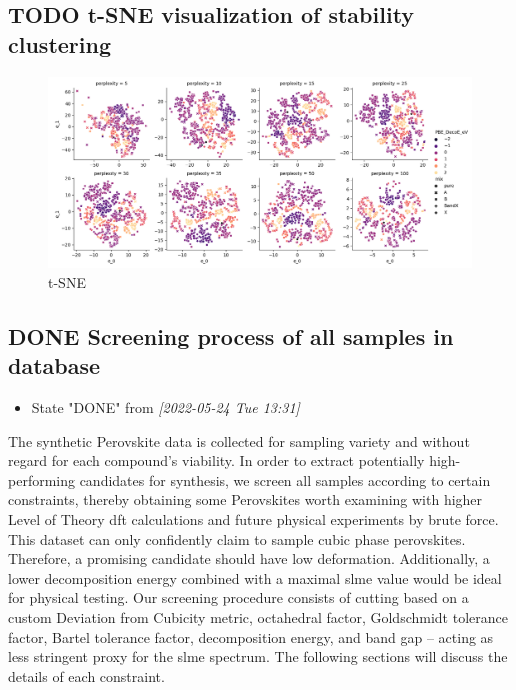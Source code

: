 \documentclass[twoside, twocolumn, 9pt, draft]{article}
\begin{document}
\subsection*{{\bfseries\sffamily TODO} t-SNE visualization of stability clustering}
\label{sec:org80211cf}
\begin{figure}
\centering
\includegraphics[width=.9\linewidth]{tsne_comp_DecoE_clusters.png}
\caption{\label{fig:tsne} t-SNE}
\end{figure}

\subsection*{{\bfseries\sffamily DONE} Screening process of all samples in database}
\label{sec:orge2a0600}
\begin{itemize}
\item State "DONE"       from              \textit{[2022-05-24 Tue 13:31]}
\end{itemize}
The synthetic Perovskite data is collected for sampling variety and
without regard for each compound's viability. In order to extract
potentially high-performing candidates for synthesis, we screen all
samples according to certain constraints, thereby obtaining some
Perovskites worth examining with higher Level of Theory
\acrshort{dft} calculations and future physical experiments by
brute force. This dataset can only confidently claim to sample cubic
phase perovskites. Therefore, a promising candidate should have low
deformation. Additionally, a lower decomposition energy combined with
a maximal \gls{slme} value would be ideal for physical
testing. Our screening procedure consists of cutting based on a custom
Deviation from Cubicity metric, octahedral factor, Goldschmidt
tolerance factor, Bartel tolerance factor, decomposition energy, and
band gap -- acting as less stringent proxy for the \gls{slme}
spectrum. The following sections will discuss the details of each
constraint.
\end{document}

